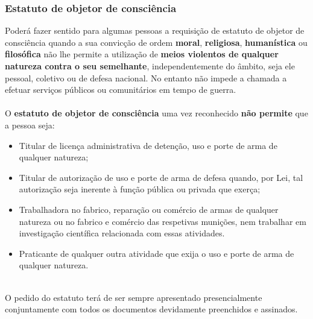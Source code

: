 \subsubsection{Estatuto de objetor de consciência}

Poderá fazer sentido para algumas pessoas a requisição de estatuto de
objetor de consciência quando a sua convicção de ordem \textbf{moral},
\textbf{religiosa}, \textbf{humanística} ou \textbf{filosófica} não lhe
permite a utilização de \textbf{meios violentos de qualquer natureza
	contra o seu semelhante}, independentemente do âmbito, seja ele pessoal,
coletivo ou de defesa nacional. No entanto não impede a chamada a
efetuar serviços públicos ou comunitários em tempo de guerra. \\
\\
O \textbf{estatuto de objetor de consciência} uma vez reconhecido
\textbf{não permite} que a pessoa seja:
\begin{itemize}
	\item Titular de licença administrativa de detenção, uso e porte de arma de qualquer natureza;
	\item Titular de autorização de uso e porte de arma de defesa quando, por Lei, tal autorização seja inerente à função pública ou privada que exerça;
	\item Trabalhadora no fabrico, reparação ou comércio de armas de qualquer natureza ou no fabrico e comércio das respetivas munições, nem trabalhar em investigação científica relacionada com essas atividades.
	\item Praticante de qualquer outra atividade que exija o uso e porte de arma de qualquer natureza.
\end{itemize}
\leavevmode\\
O pedido do estatuto terá de ser sempre apresentado presencialmente
conjuntamente com todos os documentos devidamente preenchidos e
assinados. \\
\\


